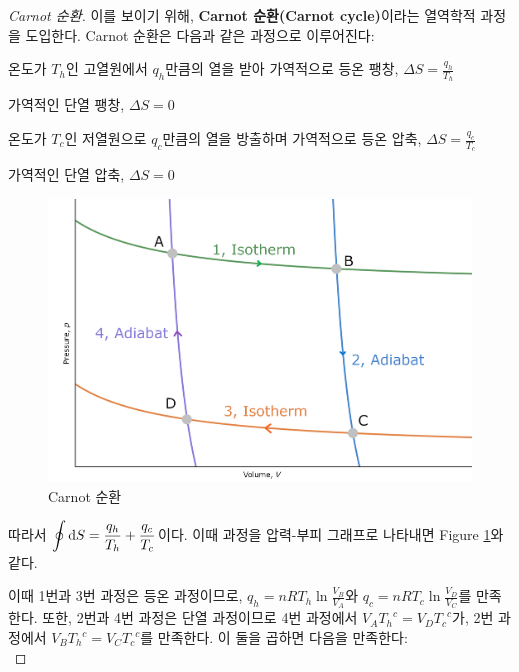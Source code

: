         \begin{proof}[Carnot 순환]
        이를 보이기 위해, \textbf{Carnot 순환(Carnot cycle)}이라는 열역학적 과정을 도입한다. Carnot 순환은 다음과 같은 과정으로 이루어진다:
        \begin{enum}
            \item 온도가 $T_h$인 고열원에서 $q_h$만큼의 열을 받아 가역적으로 등온 팽창, $\displaystyle \Delta S = \frac{q_h}{T_h}$
            \item 가역적인 단열 팽창, $\displaystyle\Delta S = 0$
            \item 온도가 $T_c$인 저열원으로 $q_c$만큼의 열을 방출하며 가역적으로 등온 압축, $\displaystyle \Delta S = \frac{q_c}{T_c}$
            \item 가역적인 단열 압축, $\displaystyle\Delta S = 0$
        \end{enum}
        \begin{figure}[H]
            \centering
            \includegraphics[scale=2]{Images/CarnotCycle.png}
            \caption{Carnot 순환}\label{f4}
        \end{figure}
        따라서 $\displaystyle\oint \operatorname{d\!} S = \frac{q_h}{T_h} + \frac{q_c}{T_c}$이다. 이때 과정을 압력-부피 그래프로 나타내면 Figure \ref{f4}와 같다.
        \par 이때 1번과 3번 과정은 등온 과정이므로, $\displaystyle q_h = nRT_h \ln{\frac{V_B}{V_A}}$와 $\displaystyle q_c = nRT_c \ln{\frac{V_D}{V_C}}$를 만족한다. 
        또한, 2번과 4번 과정은 단열 과정이므로 4번 과정에서 $\displaystyle V_A {T_h}^c = V_D {T_c}^c$가, 
        2번 과정에서 $\displaystyle V_B {T_h}^c = V_C {T_c}^c$를 만족한다. 이 둘을 곱하면 다음을 만족한다:
        \begin{equation*}

\end{equation*}
\end{proof}
